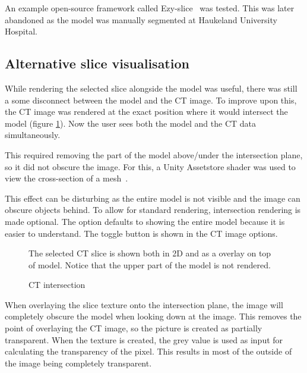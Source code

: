 \documentclass[a4paper]{report}
\begin{document}
An example open-source framework called Ezy-slice~\cite{arayan_davidarayanezy-slice_2022} was tested. This was later abandoned as the model was manually segmented at Haukeland University Hospital.

\subsection{Alternative slice visualisation}
While rendering the selected slice alongside the model was useful, there was still a some disconnect between the model and the CT image. 
To improve upon this, the CT image was rendered at the exact position where it would intersect the model (figure \ref{intersection}). Now the user sees both the model and the CT data simultaneously.

This required removing the part of the model above/under the intersection plane, so it did not obscure the image. For this, a Unity Assetstore shader was used to view the cross-section of a mesh~\cite{aldandarawy_unity_2019}.

This effect can be disturbing as the entire model is not visible and the image can obscure objects behind. To allow for standard rendering, intersection rendering is made optional. The option defaults to showing the entire model because it is easier to understand.
The toggle button is shown in the CT image options.

\begin{figure}[h!]
    \centering
	\hfill
	\caption{CT intersection}\label{intersection}
  \small
  The selected CT slice is shown both in 2D and as a overlay on top of model. Notice that the upper part of the model is not rendered.
\end{figure}

When overlaying the slice texture onto the intersection plane, the image will completely obscure the model when looking down at the image. This removes the point of overlaying the CT image, so the picture is created as partially transparent. When the texture is created, the grey value is used as input for calculating the transparency of the pixel. This results in most of the outside of the image being completely transparent.
\end{document}
